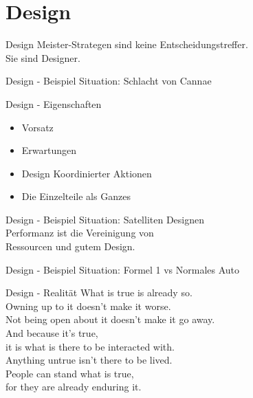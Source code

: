 \section{Design}


\begin{frame}[c]{Design}
    \large
    Meister-Strategen sind keine Entscheidungstreffer. \\
    \pause \LARGE
    Sie sind Designer.
\end{frame}


\begin{frame}[c]{Design - Beispiel}
    \Large
    Situation: Schlacht von Cannae
\end{frame}


\begin{frame}[c]{Design - Eigenschaften}
    \large
    \begin{itemize}
        \item Vorsatz
            \pause
        \item Erwartungen
            \pause
        \item Design Koordinierter Aktionen
            \pause
        \item Die Einzelteile als Ganzes
    \end{itemize}
\end{frame}


\begin{frame}[c]{Design - Beispiel}
    \Large
    Situation: Satelliten Designen \\
    \pause
    Performanz ist die Vereinigung von \\
    Ressourcen und gutem Design.
\end{frame}


\begin{frame}[c]{Design - Beispiel}
    \Large
    Situation: Formel 1 vs Normales Auto
\end{frame}


\begin{frame}[c]{Design - Realität}
    \large
    What is true is already so. \\
    Owning up to it doesn't make it worse. \\ \pause
    Not being open about it doesn't make it go away. \\ \pause
    And because it's true, \\
    it is what is there to be interacted with. \\ \pause
    Anything untrue isn't there to be lived. \\ \pause
    People can stand what is true, \\
    for they are already enduring it.
\end{frame}

